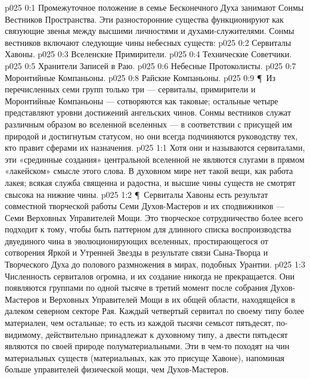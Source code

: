 \vs p025 0:1 Промежуточное положение в семье Бесконечного Духа занимают Сонмы Вестников Пространства. Эти разносторонние существа функционируют как связующие звенья между высшими личностями и духами\hyp{}служителями. Сонмы вестников включают следующие чины небесных существ:
\vs p025 0:2 \bibnobreakspace Сервиталы Хавоны.
\vs p025 0:3 \bibnobreakspace Вселенские Примирители.
\vs p025 0:4 \bibnobreakspace Технические Советчики.
\vs p025 0:5 \bibnobreakspace Хранители Записей в Раю.
\vs p025 0:6 \bibnobreakspace Небесные Протоколисты.
\vs p025 0:7 \bibnobreakspace Моронтийные Компаньоны.
\vs p025 0:8 \bibnobreakspace Райские Компаньоны.
\vs p025 0:9 \P\ Из перечисленных семи групп только три --- сервиталы, примирители и Моронтийные Компаньоны --- сотворяются как таковые; остальные четыре представляют уровни достижений ангельских чинов. Сонмы вестников служат различным образом во вселенной вселенных --- в соответствии с присущей им природой и достигнутым статусом, но они всегда подчиняются руководству тех, кто правит сферами их назначения.
\vs p025 1:1 Хотя они и называются сервиталами, эти «срединные создания» центральной вселенной не являются слугами в прямом «лакейском» смысле этого слова. В духовном мире нет такой вещи, как работа лакея; всякая служба священна и радостна, и высшие чины существ не смотрят свысока на нижние чины.
\vs p025 1:2 \P\ Сервиталы Хавоны есть результат совместной творческой работы Семи Духов\hyp{}Мастеров и их сподвижников --- Семи Верховных Управителей Мощи. Это творческое сотрудничество более всего подходит к тому, чтобы быть паттерном для длинного списка воспроизводства двуединого чина в эволюционирующих вселенных, простирающегося от сотворения Яркой и Утренней Звезды в результате связи Сына\hyp{}Творца и Творческого Духа до полового размножения в мирах, подобных Урантии.
\vs p025 1:3 Численность сервиталов огромна, и их создание никогда не прекращается. Они появляются группами по одной тысяче в третий момент после собрания Духов\hyp{}Мастеров и Верховных Управителей Мощи в их общей области, находящейся в далеком северном секторе Рая. Каждый четвертый сервитал по своему типу более материален, чем остальные; то есть из каждой тысячи семьсот пятьдесят, по\hyp{}видимому, действительно принадлежат к духовному типу, а двести пятьдесят являются по своей природе полуматериальными. Эти  в чем\hyp{}то походят на чин материальных существ (материальных, как это присуще Хавоне), напоминая больше управителей физической мощи, чем Духов\hyp{}Мастеров.
